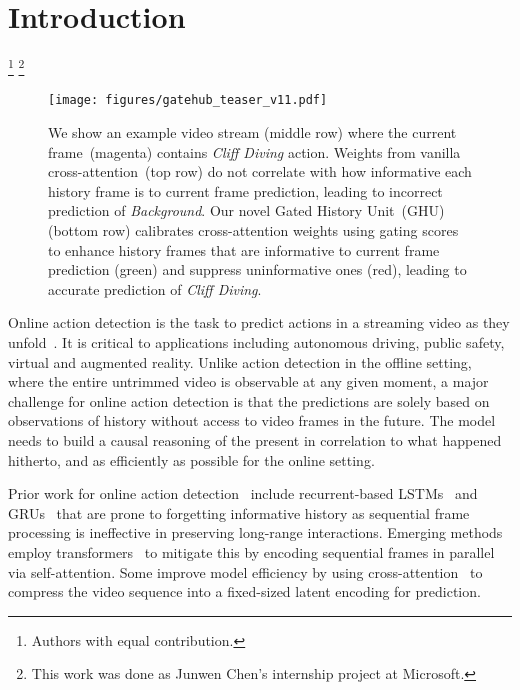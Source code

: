 \documentclass[10pt,twocolumn,letterpaper]{article}
\begin{document}
%
 \vspace{-1.5em}
\section{Introduction}
\let\thefootnote\relax\footnote{Authors with equal contribution.}
\let\thefootnote\relax\footnote{This work was done as Junwen Chen’s internship project at Microsoft.}
\label{sec:intro}
\begin{figure}[t]
\begin{center}
    \texttt{[image: figures/gatehub\_teaser\_v11.pdf]}
\end{center}
\vspace{-1.5em}
\caption{We show an example video stream (middle row) where the current frame~({\color{magenta}magenta}) contains \textit{Cliff Diving} action. Weights from vanilla cross-attention~(top row) do not correlate with how informative each history frame is to current frame prediction, leading to incorrect prediction of \textit{Background}. Our novel Gated History Unit~(GHU) (bottom row) calibrates cross-attention weights using gating scores to enhance history frames that are informative to current frame prediction ({\color{green}green}) and suppress uninformative ones ({\color{red}red}), leading to accurate prediction of \textit{Cliff Diving}.
}
\label{fig:teaser}
\vspace{-1.5em} 
\end{figure}
Online action detection is the task to predict actions in a streaming video as they unfold~\cite{de2016online}. It is critical to applications including autonomous driving, public safety, virtual and augmented reality. Unlike action detection in the offline setting, where the entire untrimmed video is observable at any given moment, a major challenge for online action detection is that the predictions are solely based on observations of history without access to video frames in the future. The model needs to build a causal reasoning of the present in correlation to what happened hitherto, and as efficiently as possible for the online setting.


Prior work for online action detection~\cite{xu2019temporal, eun2020learning, eun2021temporal, gao2020woad,qu2020lap,zhao2020privileged} include recurrent-based LSTMs~\cite{hochreiter1997long} and GRUs~\cite{cho2014learning} that are prone to forgetting informative history as sequential frame processing is ineffective in preserving long-range interactions. Emerging methods~\cite{wang2021oadtr,xu2021long} employ transformers~\cite{vaswani2017attention} to mitigate this by encoding sequential frames in parallel via self-attention. Some improve model efficiency by using cross-attention~\cite{xu2021long, jaegle2021perceiverio} to compress the video sequence into a fixed-sized latent encoding for prediction. 
\end{document}
